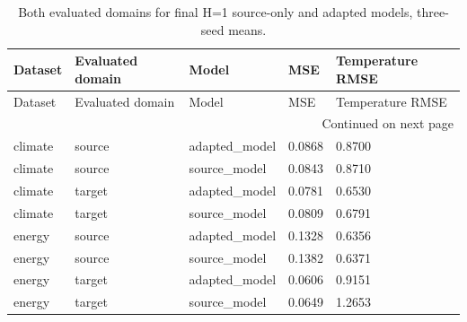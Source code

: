{\footnotesize
\setlength{\tabcolsep}{3pt}
\renewcommand{\arraystretch}{1.17}
\begin{longtable}{@{}p{}p{}p{}p{}p{}@{}}
\caption{Both evaluated domains for final H=1 source-only and adapted models, three-seed means.}\label{tab:source_retention}\\
\toprule
Dataset & Evaluated domain & Model & MSE & Temperature RMSE \\
\midrule\endfirsthead
Dataset & Evaluated domain & Model & MSE & Temperature RMSE \\
\midrule\endhead
\midrule\multicolumn{5}{r}{Continued on next page}\\\endfoot
\bottomrule\endlastfoot
climate & source & adapted\_\allowbreak{}model & 0.0868 & 0.8700 \\
climate & source & source\_\allowbreak{}model & 0.0843 & 0.8710 \\
climate & target & adapted\_\allowbreak{}model & 0.0781 & 0.6530 \\
climate & target & source\_\allowbreak{}model & 0.0809 & 0.6791 \\
energy & source & adapted\_\allowbreak{}model & 0.1328 & 0.6356 \\
energy & source & source\_\allowbreak{}model & 0.1382 & 0.6371 \\
energy & target & adapted\_\allowbreak{}model & 0.0606 & 0.9151 \\
energy & target & source\_\allowbreak{}model & 0.0649 & 1.2653 \\
\end{longtable}
}
